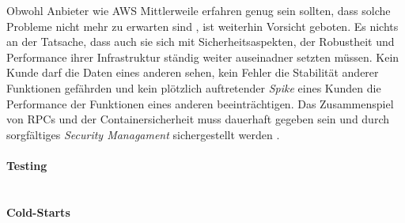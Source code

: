 \documentclass[11pt]{article}
\begin{document}
Obwohl Anbieter wie AWS Mittlerweile erfahren genug sein sollten, dass solche Probleme nicht mehr zu erwarten sind \cite{fowler2018serverless}, ist weiterhin Vorsicht geboten. Es nichts an der Tatsache, dass auch sie sich mit Sicherheitsaspekten, der Robustheit und Performance ihrer Infrastruktur ständig weiter auseinadner setzten müssen. Kein Kunde darf die Daten eines anderen sehen, kein Fehler die Stabilität anderer Funktionen gefährden und kein plötzlich auftretender \textit{Spike} eines Kunden die Performance der Funktionen eines anderen beeinträchtigen. Das Zusammenspiel von RPCs und der Containersicherheit muss dauerhaft gegeben sein und durch sorgfältiges \textit{Security Managament} sichergestellt werden \cite{mcgrath2017serverless}.  \\\\
\textbf{Testing}\\
\\\\
\textbf{Cold-Starts}\\
\end{document}
